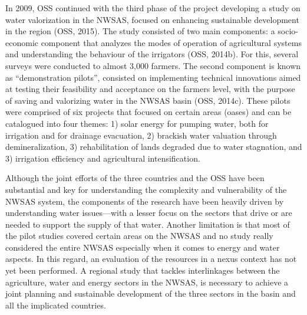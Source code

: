 In 2009, OSS continued with the third phase of the project developing a study on water valorization in the NWSAS, focused on enhancing sustainable development in the region (OSS, 2015). The study consisted of two main components: a socio-economic component that analyzes the modes of operation of agricultural systems and understanding the behaviour of the irrigators (OSS, 2014b). For this, several surveys were conducted to almost 3,000 farmers. The second component is known as “demonstration pilots”, consisted on implementing technical innovations aimed at testing their feasibility and acceptance on the farmers level, with the purpose of saving and valorizing water in the NWSAS basin (OSS, 2014c). These pilots were comprised of six projects that focused on certain areas (oases) and can be catalogued into four themes: 1) solar energy for pumping water, both for irrigation and for drainage evacuation, 2) brackish water valuation through demineralization, 3) rehabilitation of lands degraded due to water stagnation, and 3) irrigation efficiency and agricultural intensification.

Although the joint efforts of the three countries and the OSS have been substantial and key for understanding the complexity and vulnerability of the NWSAS system, the components of the research have been heavily driven by understanding water issues---with a lesser focus on the sectors that drive or are needed to support the supply of that water. Another limitation is that most of the pilot studies covered certain areas on the NWSAS and no study really considered the entire NWSAS especially when it comes to energy and water aspects. In this regard, an evaluation of the resources in a nexus context has not yet been performed. A regional study that tackles interlinkages between the agriculture, water and energy sectors in the NWSAS, is necessary to achieve a joint planning and sustainable development of the three sectors in the basin and all the implicated countries. 
\cite{gremillionWastewaterResourceWaterWasteEnergy}